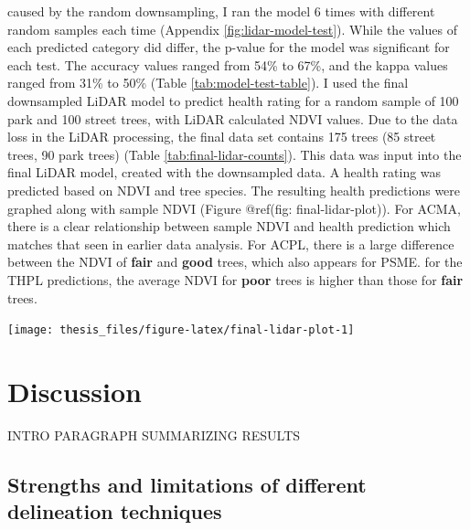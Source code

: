 \documentclass[12pt,twoside]{reedthesis}
\begin{document}
caused by the random downsampling, I ran the model 6 times with
different random samples each time (Appendix
\ref{fig:lidar-model-test}). While the values of each predicted
category did differ, the p-value for the model was significant for each
test. The accuracy values ranged from 54\% to 67\%, and the kappa values
ranged from 31\% to 50\% (Table \ref{tab:model-test-table}). I used the
final downsampled LiDAR model to predict health rating for a random
sample of 100 park and 100 street trees, with LiDAR calculated NDVI
values. Due to the data loss in the LiDAR processing, the final data set
contains 175 trees (85 street trees, 90 park trees) (Table
\ref{tab:final-lidar-counts}). This data was input into the final LiDAR
model, created with the downsampled data. A health rating was predicted
based on NDVI and tree species. The resulting health predictions were
graphed along with sample NDVI (Figure @ref(fig: final-lidar-plot)).
For ACMA, there is a clear relationship between sample NDVI and health
prediction which matches that seen in earlier data analysis. For ACPL,
there is a large difference between the NDVI of \textbf{fair} and \textbf{good}
trees, which also appears for PSME. for the THPL predictions, the
average NDVI for \textbf{poor} trees is higher than those for \textbf{fair} trees.
\begin{center}\texttt{[image: thesis\_files/figure-latex/final-lidar-plot-1]} \end{center}

\hypertarget{discussion}{%
\chapter{Discussion}\label{discussion}}

INTRO PARAGRAPH SUMMARIZING RESULTS

\hypertarget{strengths-and-limitations-of-different-delineation-techniques}{%
\section{Strengths and limitations of different delineation techniques}\label{strengths-and-limitations-of-different-delineation-techniques}}
\end{document}

